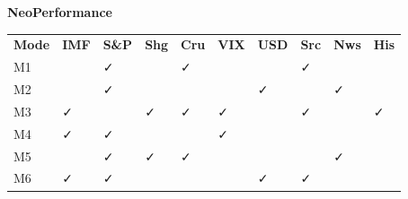 \textbf{NeoPerformance}



{\def\LTcaptype{none} %

\begin{longtable}[]{@{}

  >{\raggedright\arraybackslash}p{}

  >{\raggedright\arraybackslash}p{}

  >{\raggedright\arraybackslash}p{}

  >{\raggedright\arraybackslash}p{}

  >{\raggedright\arraybackslash}p{}

  >{\raggedright\arraybackslash}p{}

  >{\raggedright\arraybackslash}p{}

  >{\raggedright\arraybackslash}p{}

  >{\raggedright\arraybackslash}p{}

  >{\raggedright\arraybackslash}p{}@{}}

\toprule\noalign{}

\endhead

\bottomrule\noalign{}

\endlastfoot

\textbf{Mode} & \textbf{IMF} & \textbf{S\&P} & \textbf{Shg} &

\textbf{Cru} & \textbf{VIX} & \textbf{USD} & \textbf{Src} & \textbf{Nws}

& \textbf{His} \\

M1 & & ✓ & & ✓ & & & ✓ & & \\

M2 & & ✓ & & & & ✓ & & ✓ & \\

M3 & ✓ & & ✓ & ✓ & ✓ & & ✓ & & ✓ \\

M4 & ✓ & ✓ & & & ✓ & & & & \\

M5 & & ✓ & ✓ & ✓ & & & & ✓ & \\

M6 & ✓ & ✓ & & & & ✓ & ✓ & & \\

\end{longtable}

}



